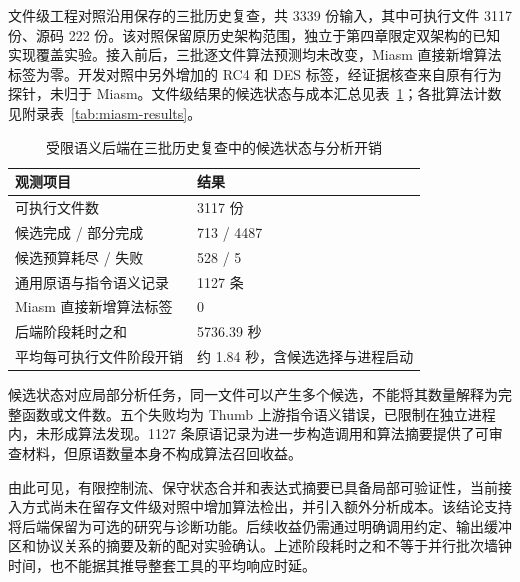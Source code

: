 文件级工程对照沿用保存的三批历史复查，共 3339 份输入，其中可执行文件 3117 份、源码 222 份。该对照保留原历史架构范围，独立于第四章限定双架构的已知实现覆盖实验。接入前后，三批逐文件算法预测均未改变，Miasm 直接新增算法标签为零。开发对照中另外增加的 RC4 和 DES 标签，经证据核查来自原有行为探针，未归于 Miasm。文件级结果的候选状态与成本汇总见表~\ref{tab:semantic-backend-summary}；各批算法计数见附录表~\ref{tab:miasm-results}。

\begin{table}[!htbp]
  \centering
  \small
  \caption{受限语义后端在三批历史复查中的候选状态与分析开销}
  \label{tab:semantic-backend-summary}
  \begin{tabularx}{\linewidth}{@{}p{4.6cm}X@{}}
    \toprule
    观测项目 & 结果\\
    \midrule
    可执行文件数 & 3117 份\\
    候选完成 / 部分完成 & 713 / 4487\\
    候选预算耗尽 / 失败 & 528 / 5\\
    通用原语与指令语义记录 & 1127 条\\
    Miasm 直接新增算法标签 & 0\\
    后端阶段耗时之和 & 5736.39 秒\\
    平均每可执行文件阶段开销 & 约 1.84 秒，含候选选择与进程启动\\
    \bottomrule
  \end{tabularx}
\end{table}

候选状态对应局部分析任务，同一文件可以产生多个候选，不能将其数量解释为完整函数或文件数。五个失败均为 Thumb 上游指令语义错误，已限制在独立进程内，未形成算法发现。1127 条原语记录为进一步构造调用和算法摘要提供了可审查材料，但原语数量本身不构成算法召回收益。

由此可见，有限控制流、保守状态合并和表达式摘要已具备局部可验证性，当前接入方式尚未在留存文件级对照中增加算法检出，并引入额外分析成本。该结论支持将后端保留为可选的研究与诊断功能。后续收益仍需通过明确调用约定、输出缓冲区和协议关系的摘要及新的配对实验确认。上述阶段耗时之和不等于并行批次墙钟时间，也不能据其推导整套工具的平均响应时延。
